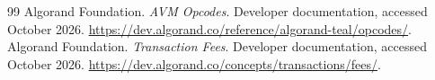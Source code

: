 \documentclass[10pt]{article}
\begin{document}
\begin{thebibliography}{99}
Algorand Foundation.
\newblock \emph{AVM Opcodes}.
\newblock Developer documentation, accessed October 2026.
\newblock \url{https://dev.algorand.co/reference/algorand-teal/opcodes/}.
Algorand Foundation.
\newblock \emph{Transaction Fees}.
\newblock Developer documentation, accessed October 2026.
\newblock \url{https://dev.algorand.co/concepts/transactions/fees/}.
\end{thebibliography}
\end{document}
